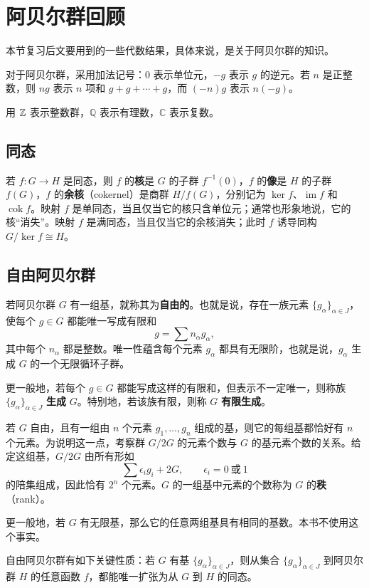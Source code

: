 \section{阿贝尔群回顾}
本节复习后文要用到的一些代数结果，具体来说，是关于阿贝尔群的知识。

对于阿贝尔群，采用加法记号：$0$ 表示单位元，$-g$ 表示 $g$ 的逆元。若 $n$ 是正整数，则 $ng$ 表示 $n$ 项和 $g+g+\cdots+g$，而 $(-n)g$ 表示 $n(-g)$。

用 $\mathbb{Z}$ 表示整数群，$\mathbb Q$ 表示有理数，$\mathbb C$ 表示复数。

\subsection*{同态}
若 $f:G\to H$ 是同态，则 $f$ 的\textbf{核}是 $G$ 的子群 $f^{-1}(0)$，$f$ 的\textbf{像}是 $H$ 的子群 $f(G)$，$f$ 的\textbf{余核}（cokernel）是商群 $H/f(G)$，分别记为 $\ker f$、$\operatorname{im}f$ 和 $\operatorname{cok}f$。映射 $f$ 是单同态，当且仅当它的核只含单位元；通常也形象地说，它的核“消失”。映射 $f$ 是满同态，当且仅当它的余核消失；此时 $f$ 诱导同构 $G/\ker f\cong H$。

\subsection*{自由阿贝尔群}
若阿贝尔群 $G$ 有一组基，就称其为\textbf{自由的}。也就是说，存在一族元素 $\{g_\alpha\}_{\alpha\in J}$，使每个 $g\in G$ 都能唯一写成有限和
\[
g=\sum n_\alpha g_\alpha,
\]
其中每个 $n_\alpha$ 都是整数。唯一性蕴含每个元素 $g_\alpha$ 都具有无限阶，也就是说，$g_\alpha$ 生成 $G$ 的一个无限循环子群。

更一般地，若每个 $g\in G$ 都能写成这样的有限和，但表示不一定唯一，则称族 $\{g_\alpha\}_{\alpha\in J}$ \textbf{生成} $G$。特别地，若该族有限，则称 $G$ \textbf{有限生成}。

若 $G$ 自由，且有一组由 $n$ 个元素 $g_1,\ldots,g_n$ 组成的基，则它的每组基都恰好有 $n$ 个元素。为说明这一点，考察群 $G/2G$ 的元素个数与 $G$ 的基元素个数的关系。给定这组基，$G/2G$ 由所有形如
\[
\sum\epsilon_i g_i+2G,\qquad \epsilon_i=0\ \text{或}\ 1
\]
的陪集组成，因此恰有 $2^n$ 个元素。$G$ 的一组基中元素的个数称为 $G$ 的\textbf{秩}（rank）。

更一般地，若 $G$ 有无限基，那么它的任意两组基具有相同的基数。本书不使用这个事实。

自由阿贝尔群有如下关键性质：若 $G$ 有基 $\{g_\alpha\}_{\alpha\in J}$，则从集合 $\{g_\alpha\}_{\alpha\in J}$ 到阿贝尔群 $H$ 的任意函数 $f$，都能唯一扩张为从 $G$ 到 $H$ 的同态。


